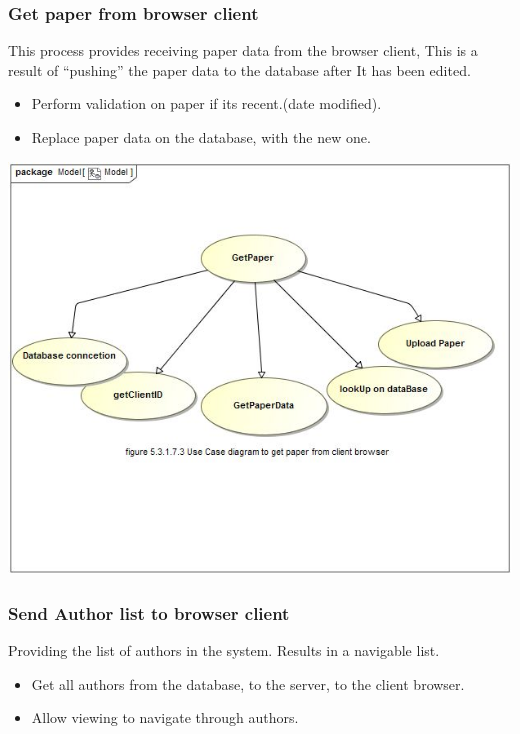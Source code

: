 \documentclass[hidelinks,a4paper,12pt]{article}
\begin{document}
		\subsubsection{Get paper from browser client}
	
	This process provides receiving paper data from the browser client,
	This is a result of “pushing” the paper data to the database after    
	It has been edited. 
	
		\begin{itemize}
			\item Perform validation on paper if its recent.(date modified).
			\item Replace paper data on the database, with the new one.
		\end{itemize}
		
		\includegraphics[width=1\textwidth]{./Graphs/UseCaseforGetpaper.JPG}\\[0.4cm]
	
	
	\subsubsection{Send Author list to browser client}
	
	Providing the list of authors in the system. Results in a navigable
	list.		
	
	\begin{itemize}
		\item Get all authors from the database, to the server, to the client browser.
		\item Allow viewing to navigate through authors.
	\end{itemize}
	
\end{document}
